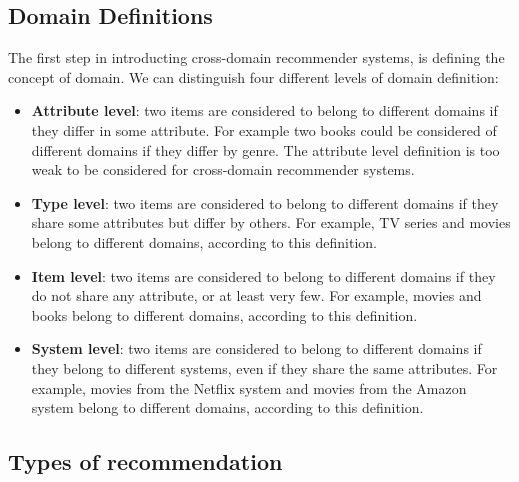 \subsection{Domain Definitions}

The first step in introducting cross-domain recommender systems, is defining the concept of domain. We can distinguish four different levels of domain definition:
\begin{itemize}
\item \textbf{Attribute level}: two items are considered to belong to different domains if they differ in some attribute. For example two books could be considered of different domains if they differ by genre. The attribute level definition is too weak to be considered for cross-domain recommender systems.
\item \textbf{Type level}: two items are considered to belong to different domains if they share some attributes but differ by others. For example, TV series and movies belong to different domains, according to this definition.
\item \textbf{Item level}: two items are considered to belong to different domains if they do not share any attribute, or at least very few. For example, movies and books belong to different domains, according to this definition.
\item \textbf{System level}: two items are considered to belong to different domains if they belong to different systems, even if they share the same attributes. For example, movies from the Netflix system and movies from the Amazon system belong to different domains, according to this definition.
\end{itemize}


\subsection{Types of recommendation}

